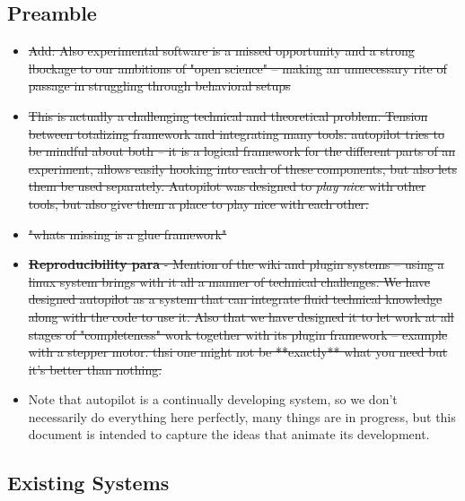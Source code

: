 \subsection{Preamble}

\begin{itemize}
\item \sout{Add: Also experimental software is a missed opportunity and a strong lbockage to our ambitions of "open science" -- making an unnecessary rite of passage in struggling through behavioral setups}
\item \sout{This is actually a challenging technical and theoretical problem. Tension between totalizing framework and integrating many tools: autopilot tries to be mindful about both -- it is a logical framework for the different parts of an experiment, allows easily hooking into each of these components, but also lets them be used separately. Autopilot was designed to \textit{play nice} with other tools, but also give them a place to play nice with each other.}
\item \sout{"whats missing is a glue framework"}
\item \sout{\textbf{Reproducibility para} - Mention of the wiki and plugin systems -- using a linux system brings with it all a manner of technical challenges. We have designed autopilot as a system that can integrate fluid technical knowledge along with the code to use it. Also that we have designed it to let work at all stages of "completeness" work together with its plugin framework -- example with a stepper motor. thsi one might not be **exactly** what you need but it's better than nothing.}
\item Note that autopilot is a continually developing system, so we don't necessarily do everything here perfectly, many things are in progress, but this document is intended to capture the ideas that animate its development.
\end{itemize}

\subsection{Existing Systems}

